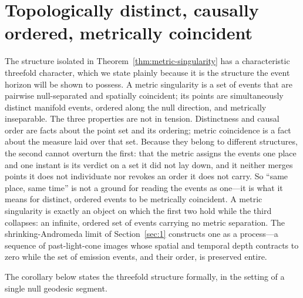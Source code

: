 \documentclass[11pt,a4paper]{article}
\theoremstyle{plain}
\theoremstyle{remark}
\begin{document}
\section{Topologically distinct, causally ordered, metrically coincident}\label{sec:2}
The structure isolated in Theorem~\ref{thm:metric-singularity} has a characteristic threefold character, which we state plainly because it is the structure the event horizon will be shown to possess. A metric singularity is a set of events that are pairwise null-separated and spatially coincident; its points are simultaneously distinct manifold events, ordered along the null direction, and metrically inseparable. The three properties are not in tension. Distinctness and causal order are facts about the point set and its ordering; metric coincidence is a fact about the measure laid over that set. Because they belong to different structures, the second cannot overturn the first: that the metric assigns the events one place and one instant is its verdict on a set it did not lay down, and it neither merges points it does not individuate nor revokes an order it does not carry. So ``same place, same time'' is not a ground for reading the events as one---it is what it means for distinct, ordered events to be metrically coincident. A metric singularity is exactly an object on which the first two hold while the third collapses: an infinite, ordered set of events carrying no metric separation. The shrinking-Andromeda limit of Section~\ref{sec:1} constructs one as a process---a sequence of past-light-cone images whose spatial and temporal depth contracts to zero while the set of emission events, and their order, is preserved entire.

The corollary below states the threefold structure formally, in the setting of a single null geodesic segment.
\end{document}
